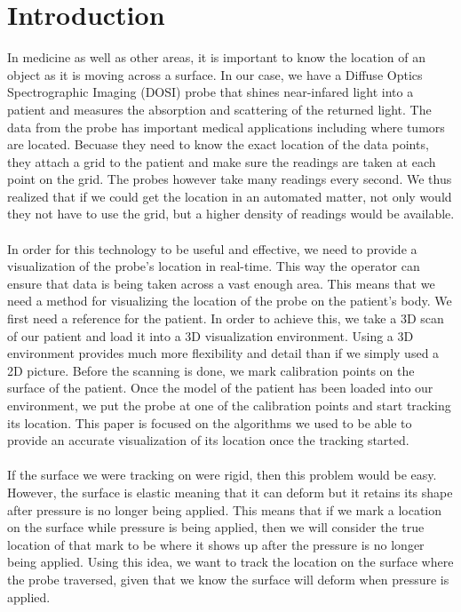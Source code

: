 \section{Introduction}

In medicine as well as other areas, it is important to know the location of an object as it is moving across a surface. In our case, we have a Diffuse Optics Spectrographic Imaging (DOSI) probe that shines near-infared light into a patient and measures the absorption and scattering of the returned light. The data from the probe has important medical applications including where tumors are located. Becuase they need to know the exact location of the data points, they attach a grid to the patient and make sure the readings are taken at each point on the grid. The probes however take many readings every second. We thus realized that if we could get the location in an automated matter, not only would they not have to use the grid, but a higher density of readings would be available. \\
\\
In order for this technology to be useful and effective, we need to provide a visualization of the probe's location in real-time. This way the operator can ensure that data is being taken across a vast enough area. This means that we need a method for visualizing the location of the probe on the patient's body. We first need a reference for the patient. In order to achieve this, we take a 3D scan of our patient and load it into a 3D visualization environment. Using a 3D environment provides much more flexibility and detail than if we simply used a 2D picture. Before the scanning is done, we mark calibration points on the surface of the patient. Once the model of the patient has been loaded into our environment, we put the probe at one of the calibration points and start tracking its location. This paper is focused on the algorithms we used to be able to provide an accurate visualization of its location once the tracking started. \\
\\
If the surface we were tracking on were rigid, then this problem would be easy. However, the surface is elastic meaning that it can deform but it retains its shape after pressure is no longer being applied. This means that if we mark a location on the surface while pressure is being applied, then we will consider the true location of that mark to be where it shows up after the pressure is no longer being applied. Using this idea, we want to track the location on the surface where the probe traversed, given that we know the surface will deform when pressure is applied. \\
